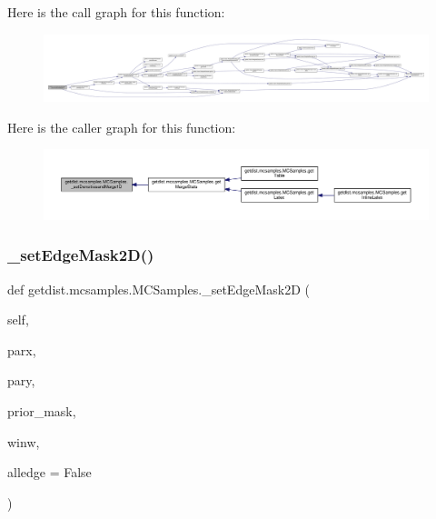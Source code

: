 Here is the call graph for this function\+:
\nopagebreak
\begin{figure}[H]
\begin{center}
\leavevmode
\includegraphics[width=350pt]{classgetdist_1_1mcsamples_1_1MCSamples_ae22105031ef07db6d65ce05fef3b15e8_cgraph}
\end{center}
\end{figure}
Here is the caller graph for this function\+:
\nopagebreak
\begin{figure}[H]
\begin{center}
\leavevmode
\includegraphics[width=350pt]{classgetdist_1_1mcsamples_1_1MCSamples_ae22105031ef07db6d65ce05fef3b15e8_icgraph}
\end{center}
\end{figure}
\mbox{\label{classgetdist_1_1mcsamples_1_1MCSamples_ad01cbb023ef1ede5d50f0f81439146a8}} 
\subsubsection{\texorpdfstring{\+\_\+set\+Edge\+Mask2\+D()}{\_setEdgeMask2D()}}
{\footnotesize\ttfamily def getdist.\+mcsamples.\+M\+C\+Samples.\+\_\+set\+Edge\+Mask2D (\begin{DoxyParamCaption}\item[{}]{self,  }\item[{}]{parx,  }\item[{}]{pary,  }\item[{}]{prior\+\_\+mask,  }\item[{}]{winw,  }\item[{}]{alledge = {\ttfamily False} }\end{DoxyParamCaption})\hspace{0.3cm}{\ttfamily [private]}}



